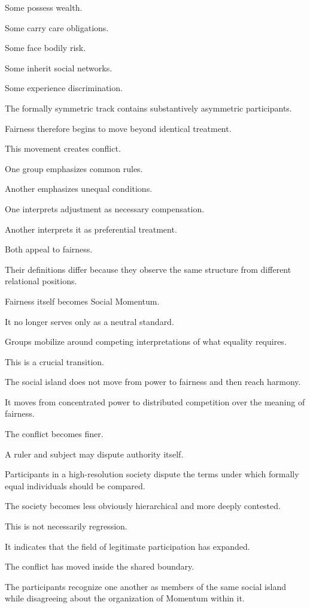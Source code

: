Some possess wealth.

Some carry care obligations.

Some face bodily risk.

Some inherit social networks.

Some experience discrimination.

The formally symmetric track contains substantively asymmetric participants.

Fairness therefore begins to move beyond identical treatment.

This movement creates conflict.

One group emphasizes common rules.

Another emphasizes unequal conditions.

One interprets adjustment as necessary compensation.

Another interprets it as preferential treatment.

Both appeal to fairness.

Their definitions differ because they observe the same structure from different relational positions.

Fairness itself becomes Social Momentum.

It no longer serves only as a neutral standard.

Groups mobilize around competing interpretations of what equality requires.

This is a crucial transition.

The social island does not move from power to fairness and then reach harmony.

It moves from concentrated power to distributed competition over the meaning of fairness.

The conflict becomes finer.

A ruler and subject may dispute authority itself.

Participants in a high-resolution society dispute the terms under which formally equal individuals should be compared.

The society becomes less obviously hierarchical and more deeply contested.

This is not necessarily regression.

It indicates that the field of legitimate participation has expanded.

The conflict has moved inside the shared boundary.

The participants recognize one another as members of the same social island while disagreeing about the organization of Momentum within it.

